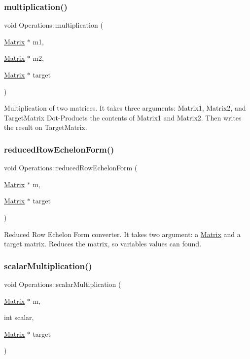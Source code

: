 \subsubsection{\texorpdfstring{multiplication()}{multiplication()}}
{\footnotesize\ttfamily void Operations\+::multiplication (\begin{DoxyParamCaption}\item[{\hyperlink{class_matrix}{Matrix} $\ast$}]{m1,  }\item[{\hyperlink{class_matrix}{Matrix} $\ast$}]{m2,  }\item[{\hyperlink{class_matrix}{Matrix} $\ast$}]{target }\end{DoxyParamCaption})}

Multiplication of two matrices. It takes three arguments\+: Matrix1, Matrix2, and Target\+Matrix Dot-\/\+Products the contents of Matrix1 and Matrix2. Then writes the result on Target\+Matrix. \mbox{\label{class_operations_a34a11aa508d4fa8343dea7ce3cb12a8f}} 
\subsubsection{\texorpdfstring{reduced\+Row\+Echelon\+Form()}{reducedRowEchelonForm()}}
{\footnotesize\ttfamily void Operations\+::reduced\+Row\+Echelon\+Form (\begin{DoxyParamCaption}\item[{\hyperlink{class_matrix}{Matrix} $\ast$}]{m,  }\item[{\hyperlink{class_matrix}{Matrix} $\ast$}]{target }\end{DoxyParamCaption})}

Reduced Row Echelon Form converter. It takes two argument\+: a \hyperlink{class_matrix}{Matrix} and a target matrix. Reduces the matrix, so variables\textquotesingle{} values can found. \mbox{\label{class_operations_a3ebc22c78ef8e19ebdc5d2761b103d22}} 
\subsubsection{\texorpdfstring{scalar\+Multiplication()}{scalarMultiplication()}}
{\footnotesize\ttfamily void Operations\+::scalar\+Multiplication (\begin{DoxyParamCaption}\item[{\hyperlink{class_matrix}{Matrix} $\ast$}]{m,  }\item[{int}]{scalar,  }\item[{\hyperlink{class_matrix}{Matrix} $\ast$}]{target }\end{DoxyParamCaption})}

